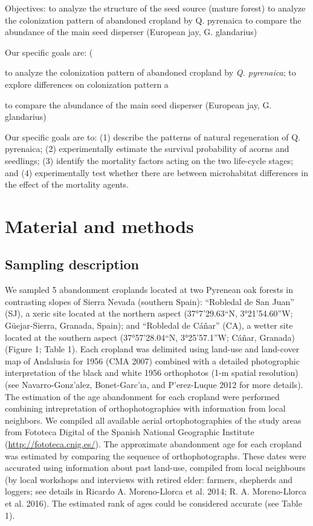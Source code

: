 \documentclass[
]{article}
\begin{document}
Objectives: to analyze the structure of the seed source (mature forest)
to analyze the colonization pattern of abandoned cropland by Q.
pyrenaica to compare the abundance of the main seed disperser (European
jay, G. glandarius)

Our specific goals are: (

to analyze the colonization pattern of abandoned cropland by \emph{Q.
pyrenaica}; to explore differences on colonization pattern a

to compare the abundance of the main seed disperser (European jay, G.
glandarius)

Our specific goals are to: (1) describe the patterns of natural
regeneration of Q. pyrenaica; (2) experimentally estimate the survival
probability of acorns and seedlings; (3) identify the mortality factors
acting on the two life-cycle stages; and (4) experimentally test whether
there are between microhabitat differences in the effect of the
mortality agents.

\hypertarget{material-and-methods}{%
\section{Material and methods}\label{material-and-methods}}

\hypertarget{sampling-description}{%
\subsection{Sampling description}\label{sampling-description}}

We sampled 5 abandonment croplands located at two Pyrenean oak forests
in contrasting slopes of Sierra Nevada (southern Spain): ``Robledal de
San Juan'' (SJ), a xeric site located at the northern aspect
(37°7'29.63``N, 3°21'54.60''W; Güejar-Sierra, Granada, Spain); and
``Robledal de Cáñar'' (CA), a wetter site located at the southern aspect
(37°57'28.04``N, 3°25'57.1''W; Cáñar, Granada) (Figure 1; Table 1). Each
cropland was delimited using land-use and land-cover map of Andalusia
for 1956 (CMA 2007) combined with a detailed photographic interpretation
of the black and white 1956 orthophotos (1-m spatial resolution) (see
Navarro-Gonz'alez, Bonet-Garc'ıa, and P'erez-Luque 2012 for more
details). The estimation of the age abandonment for each cropland were
performed combining intrepretation of orthophotographies with
information from local neighbors. We compiled all available aerial
ortophotographies of the study areas from Fototeca Digital of the
Spanish National Geographic Institute (\url{http://fototeca.cnig.es/}).
The approximate abandonment age for each cropland was estimated by
comparing the sequence of orthophotographs. These dates were accurated
using information about past land-use, compiled from local neighbours
(by local workshops and interviews with retired elder: farmers,
shepherds and loggers; see details in Ricardo A. Moreno-Llorca et al.
2014; R. A. Moreno-Llorca et al. 2016). The estimated rank of ages could
be considered accurate (see Table 1).
\end{document}
